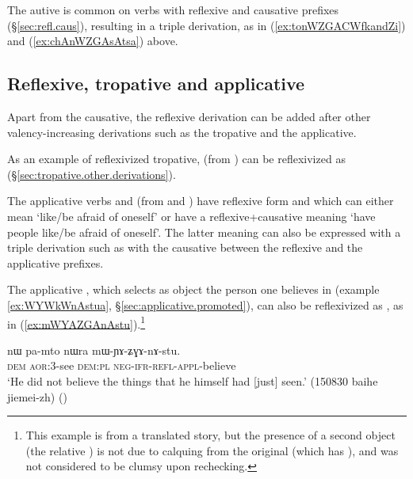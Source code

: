 The autive is common on verbs with reflexive and causative prefixes (§\ref{sec:refl.caus}), resulting in a triple derivation, as in (\ref{ex:tonWZGACWfkandZi}) and (\ref{ex:chAnWZGAsAtsa}) above.

 \subsection{Reflexive, tropative and applicative} \label{sec:refl.tropative}
Apart from the causative, the reflexive derivation can be added after other valency-increasing derivations such as the tropative and the applicative. 

As an example of reflexivized tropative,  (from ) can be reflexivized as  (§\ref{sec:tropative.other.derivations}).

The applicative verbs  and  (from  and ) have reflexive form  and   which can either mean `like/be afraid of oneself' or have a reflexive+causative meaning `have people like/be afraid of oneself'. The latter meaning can also be expressed with a triple derivation such as   with the causative  between the reflexive and the applicative prefixes.

The applicative , which selects as object the person one believes in (example \ref{ex:WYWkWnAstua}, §\ref{sec:applicative.promoted}), can also be reflexivized as , as in (\ref{ex:mWYAZGAnAstu}).\footnote{This example is from a translated story, but the presence of a second object (the relative ) is not due to calquing from the original (which has ), and was not considered to be clumsy upon rechecking. }

\begin{exe}
\ex \label{ex:mWYAZGAnAstu}
\gll nɯ pa-mto nɯra mɯ-ɲɤ-ʑɣɤ-nɤ-stu.  \\
\textsc{dem} \textsc{aor}:3\flobv{}-see \textsc{dem}:\textsc{pl} \textsc{neg}-\textsc{ifr}-\textsc{refl}-\textsc{appl}-believe \\
\glt `He did not believe the things that he himself had [just] seen.' (150830 baihe jiemei-zh) ()
\end{exe}

